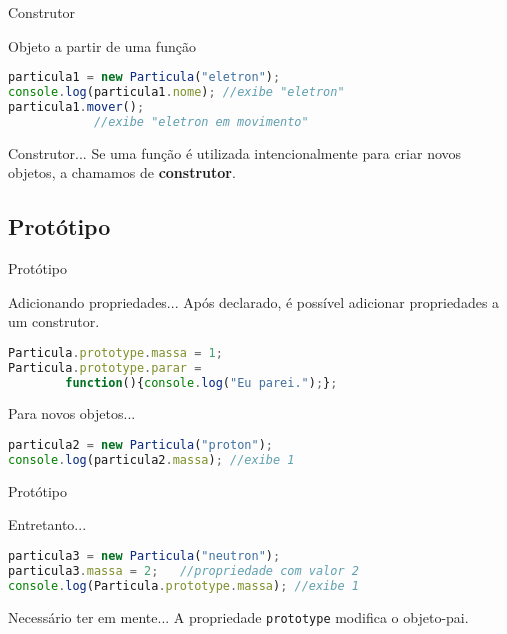 \documentclass[xcolor=dvipsnames,table]{beamer}
\begin{document}
\begin{frame}[fragile]{Construtor}
	\begin{block}{Objeto a partir de uma função}
		\begin{lstlisting}[language=JavaScript]
particula1 = new Particula("eletron");
console.log(particula1.nome); //exibe "eletron"
particula1.mover();	
			//exibe "eletron em movimento"
\end{lstlisting}	
	\end{block} \pause
	\begin{block}{Construtor...}
		Se uma função é utilizada intencionalmente para criar novos objetos, a chamamos de {\bf construtor}.
	\end{block}
\end{frame}

\subsection{Protótipo}
\begin{frame}[fragile]{Protótipo}
	\begin{block}{Adicionando propriedades...}
		Após declarado, é possível adicionar propriedades a um construtor.
		\begin{lstlisting}[language=JavaScript]
Particula.prototype.massa = 1;
Particula.prototype.parar = 
		function(){console.log("Eu parei.");};
\end{lstlisting}	
	\end{block} \pause
	\begin{block}{Para novos objetos...}
		\begin{lstlisting}[language=JavaScript]
particula2 = new Particula("proton");
console.log(particula2.massa); //exibe 1
\end{lstlisting}	
	\end{block}
\end{frame}

\begin{frame}[fragile]{Protótipo}
	\begin{block}{Entretanto...}
		\begin{lstlisting}[language=JavaScript]
particula3 = new Particula("neutron");
particula3.massa = 2;	//propriedade com valor 2
console.log(Particula.prototype.massa);	//exibe 1
\end{lstlisting}	
	\end{block} \pause
	\begin{alertblock}{Necessário ter em mente...}
		A propriedade {\tt prototype} modifica o objeto-pai.	
	\end{alertblock}
\end{frame}
\end{document}
